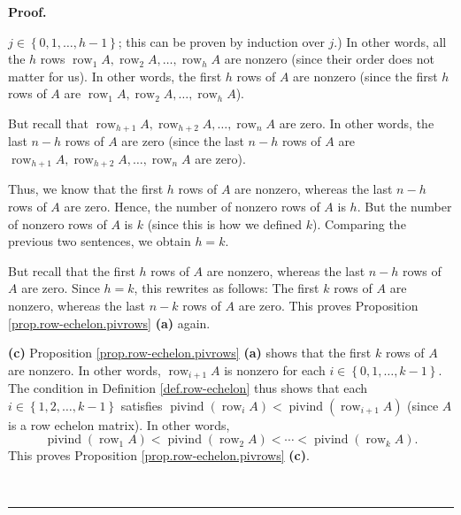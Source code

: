 \documentclass[numbers=enddot,12pt,final,onecolumn,notitlepage]{scrartcl}%
\theoremstyle{definition}
\newenvironment{proof}[1][Proof]{\noindent\textbf{#1.} }{\ \rule{0.5em}{0.5em}}
\begin{document}
\begin{proof}
{$j\in\left\{  0,1,\ldots,h-1\right\}  $; this can be proven by induction over
$j$.) In other words, all the $h$ rows $\operatorname*{row}\nolimits_{1}%
A,\operatorname*{row}\nolimits_{2}A,\ldots,\operatorname*{row}\nolimits_{h}A$
are nonzero (since their order does not matter for us). In other words, the
first $h$ rows of $A$ are nonzero (since the first $h$ rows of $A$ are
$\operatorname*{row}\nolimits_{1}A,\operatorname*{row}\nolimits_{2}%
A,\ldots,\operatorname*{row}\nolimits_{h}A$).
\par
But recall that $\operatorname*{row}\nolimits_{h+1}A,\operatorname*{row}%
\nolimits_{h+2}A,\ldots,\operatorname*{row}\nolimits_{n}A$ are zero. In other
words, the last $n-h$ rows of $A$ are zero (since the last $n-h$ rows of $A$
are $\operatorname*{row}\nolimits_{h+1}A,\operatorname*{row}\nolimits_{h+2}%
A,\ldots,\operatorname*{row}\nolimits_{n}A$ are zero).
\par
Thus, we know that the first $h$ rows of $A$ are nonzero, whereas the last
$n-h$ rows of $A$ are zero. Hence, the number of nonzero rows of $A$ is $h$.
But the number of nonzero rows of $A$ is $k$ (since this is how we defined
$k$). Comparing the previous two sentences, we obtain $h=k$.
\par
But recall that the first $h$ rows of $A$ are nonzero, whereas the last $n-h$
rows of $A$ are zero. Since $h=k$, this rewrites as follows: The first $k$
rows of $A$ are nonzero, whereas the last $n-k$ rows of $A$ are zero. This
proves Proposition \ref{prop.row-echelon.pivrows} \textbf{(a)} again.}

\textbf{(c)} Proposition \ref{prop.row-echelon.pivrows} \textbf{(a)} shows
that the first $k$ rows of $A$ are nonzero. In other words,
$\operatorname*{row}\nolimits_{i+1}A$ is nonzero for each $i\in\left\{
0,1,\ldots,k-1\right\}  $. The condition in Definition \ref{def.row-echelon}
thus shows that each $i\in\left\{  1,2,\ldots,k-1\right\}  $ satisfies
$\operatorname*{pivind}\left(  \operatorname*{row}\nolimits_{i}A\right)
<\operatorname*{pivind}\left(  \operatorname*{row}\nolimits_{i+1}A\right)  $
(since $A$ is a row echelon matrix). In other words,%
\begin{equation}
\operatorname*{pivind}\left(  \operatorname*{row}\nolimits_{1}A\right)
<\operatorname*{pivind}\left(  \operatorname*{row}\nolimits_{2}A\right)
<\cdots<\operatorname*{pivind}\left(  \operatorname*{row}\nolimits_{k}%
A\right)  . \label{pf.prop.row-echelon.pivcells.ineq}%
\end{equation}
This proves Proposition \ref{prop.row-echelon.pivrows} \textbf{(c)}.


\end{proof}
\end{document}
